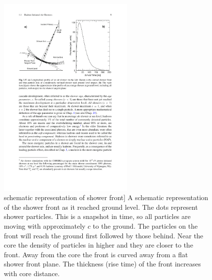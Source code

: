 \begin{figure}
    \centering
    \includegraphics[width=0.6\textwidth]
                    {plots/cosmic-rays/schematic_front}
    \caption{schematic representation of shower front]
A schematic representation of the shower front as it reached ground level. The dots represent shower particles. This is a snapshot in time, so all particles are moving with approximately $c$ to the ground. The particles on the front will reach the ground first followed by those behind. Near the core the density of particles in higher and they are closer to the front. Away from the core the front is curved away from a flat shower front plane. The thickness (rise time) of the front increases with core distance.}
    \label{fig:schematic_front}
\end{figure}

\,

